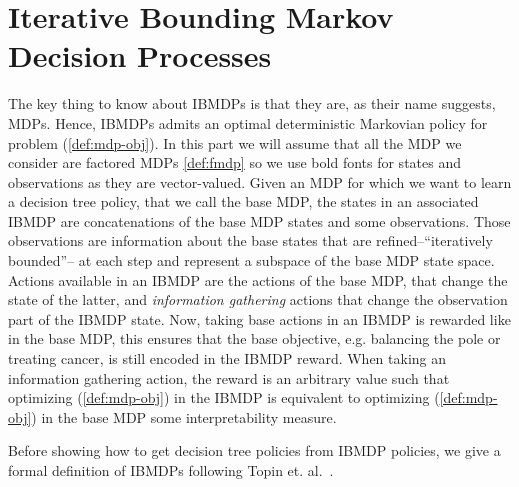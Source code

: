 \section{Iterative Bounding Markov Decision Processes}\label{sec:ibmdp}

The key thing to know about IBMDPs is that they are, as their name suggests, MDPs.
Hence, IBMDPs admits an optimal deterministic Markovian policy for problem (\ref{def:mdp-obj}).
In this part we will assume that all the MDP we consider are factored MDPs \ref{def:fmdp} so we use bold fonts for states and observations as they are vector-valued.
Given an MDP for which we want to learn a decision tree policy, that we call the base MDP, the states in an associated IBMDP are concatenations of the base MDP states and some observations. 
Those observations are information about the base states that are refined--``iteratively bounded''-- at each step and represent a subspace of the base MDP state space.
Actions available in an IBMDP are the actions of the base MDP, that change the state of the latter, and \textit{information gathering} actions that change the observation part of the IBMDP state.
Now, taking base actions in an IBMDP is rewarded like in the base MDP, this ensures that the base objective, e.g. balancing the pole or treating cancer, is still encoded in the IBMDP reward.
When taking an information gathering action, the reward is an arbitrary value such that optimizing (\ref{def:mdp-obj}) in the IBMDP is equivalent to optimizing (\ref{def:mdp-obj}) in the base MDP  some interpretability measure.
 
Before showing how to get decision tree policies from IBMDP policies, we give a formal definition of IBMDPs following Topin et. al.~\cite{topin2021iterative}.


